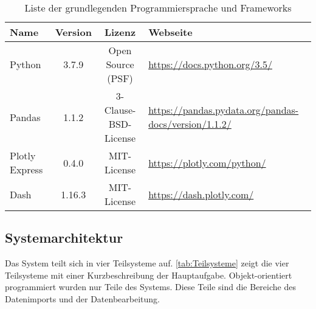     \begingroup
        \setlength{\tabcolsep}{4pt} %
        \renewcommand{\arraystretch}{1.5}
        \begin{table}[h]
            \centering
            \begin{adjustbox}{max width=\textwidth}
            \Huge
            \begin{tabular}{lccl}
               \toprule
               \textbf{Name}             &{Version}    &\textbf{Lizenz}                        & \textbf{Webseite}\\
               \midrule     
                    Python               &3.7.9         &Open Source (PSF)                     & \url{https://docs.python.org/3.5/}\\
                    Pandas               &1.1.2         &3-Clause-BSD-License                  & \url{https://pandas.pydata.org/pandas-docs/version/1.1.2/}\\
                    Plotly Express       &0.4.0         &MIT-License                           & \url{https://plotly.com/python/}\\
                    Dash                 &1.16.3        &MIT-License                           & \url{https://dash.plotly.com/}\\


                \bottomrule
            \end{tabular}
            \end{adjustbox}
            \caption{%
                Liste der grundlegenden Programmiersprache und Frameworks
            \label{tab:Software-Requirements}
            }
             \end{table}
        \endgroup
    
     
    \subsection{Systemarchitektur}
    
    Das System teilt sich in vier Teilsysteme auf. \autoref{tab:Teilsysteme} zeigt die vier Teilsysteme mit einer Kurzbeschreibung der Hauptaufgabe.
    Objekt-orientiert programmiert wurden nur Teile des Systems. Diese Teile sind die Bereiche des Datenimports und der Datenbearbeitung. 
    
